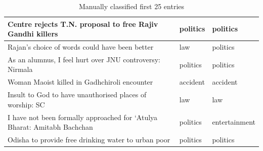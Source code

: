 \begin{table}
\begin{tabular}{ | p{5.4cm}| p{2.0cm} | p{2.0cm} | }
\hline
Centre rejects T.N. proposal to free Rajiv Gandhi killers & politics  & politics \\
\hline
Rajan’s choice of words could have been better & law  & politics  \\
\hline
As an alumnus, I feel hurt over JNU controversy: Nirmala & politics  & politics \\
\hline
Woman Maoist killed in Gadhchiroli encounter & accident  & accident  \\
\hline
Insult to God to have unauthorised places of worship: SC & law  & law  \\
\hline
I have not been formally approached for ‘Atulya Bharat: Amitabh Bachchan & politics  & entertainment  \\
\hline
Odisha to provide free drinking water to urban poor & politics  & politics  \\
\hline

\end{tabular}
\caption{Manually classified first 25 entries }
\label{table:ql2-1}
\end{table}


